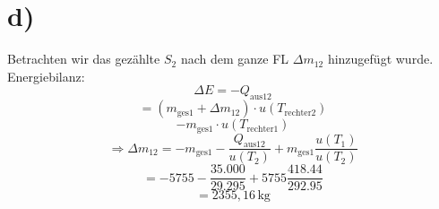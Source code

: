 

\section*{d)}
Betrachten wir das gezählte $S_2$ nach dem ganze FL $\Delta m_{12}$ hinzugefügt wurde. Energiebilanz:
\[
\Delta E = -Q_{\text{aus}12}
\]
\[
= (m_{\text{ges}1} + \Delta m_{12}) \cdot u(T_{\text{rechter}2})
\]
\[
- m_{\text{ges}1} \cdot u(T_{\text{rechter}1})
\]
\[
\Rightarrow \Delta m_{12} = -m_{\text{ges}1} - \frac{Q_{\text{aus}12}}{u(T_2)} + m_{\text{ges}1} \frac{u(T_1)}{u(T_2)}
\]
\[
= -5755 - \frac{35.000}{29.295} + 5755 \frac{418.44}{292.95}
\]
\[
= 2355{,}16 \, \text{kg}
\]